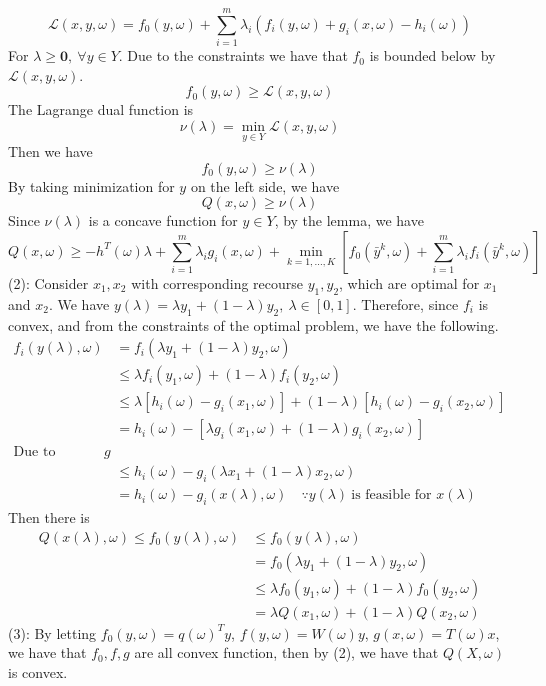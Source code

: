 \documentclass[11pt,a4paper]{article}
\begin{document}
$$\mathcal{L}(x,y,\omega)=f_{0}(y,\omega)+\sum_{i=1}^{m}\lambda_{i}(f_{i}(y,\omega)+g_{i}(x,\omega)-h_{i}(\omega))$$
For $\lambda\geq \textbf{0},\ \forall y\in Y $.
Due to the constraints we have that $f_{0}$ is bounded below by $\mathcal{L}(x,y,\omega)$.
$$f_{0}(y,\omega)\geq\mathcal{L}(x,y,\omega)$$ The Lagrange dual function is 
$$\nu(\lambda)=\min_{y\in Y}\mathcal{L}(x,y,\omega)$$
Then we have $$f_{0}(y,\omega)\geq\nu(\lambda)$$
By taking minimization for $y$ on the left side, we have $$Q(x,\omega)\geq\nu(\lambda)$$
Since $\nu(\lambda)$ is a concave function for $y\in Y$, by the lemma, we have 
$$Q(x,\omega)\geq -h^{T}(\omega)\lambda + \sum_{i=1}^{m}\lambda_{i}g_{i}(x,\omega)+\min_{k=1,\ldots,K}\left[f_{0}(\bar{y}^{k},\omega)+\sum_{i=1}^{m}\lambda_{i}f_{i}(\bar{y}^{k},\omega)\right]$$
(2): Consider $x_{1},x_{2}$ with corresponding recourse $y_{1},y_{2}$, which are optimal for $x_{1}$ and $x_{2}$.
We have $y(\lambda)=\lambda y_{1}+(1-\lambda)y_{2}, \ \lambda\in[0,1]$.
Therefore, since $f_{i}$ is convex, and from the constraints of the optimal problem, we have the following. $$\begin{aligned}
f_{i}(y(\lambda),\omega)&=f_{i}(\lambda y_{1}+(1-\lambda)y_{2},\omega)\\
&\leq \lambda f_{i}(y_{1},\omega)+(1-\lambda)f_{i}(y_{2},\omega)\\
&\leq \lambda\left[h_{i}(\omega)-g_{i}(x_{1},\omega)\right]+(1-\lambda)\left[h_{i}(\omega)-g_{i}(x_{2},\omega)\right]\\
&= h_{i}(\omega)-\left[\lambda g_{i}(x_{1},\omega)+(1-\lambda)g_{i}(x_{2},\omega)\right]\\
\text{Due to convexity of $g$}\\
& \leq h_{i}(\omega)-g_{i}(\lambda x_{1}+(1-\lambda)x_{2},\omega)\\
& = h_{i}(\omega)-g_{i}(x(\lambda),\omega) \quad \because y(\lambda) \ \text{is feasible for $x(\lambda)$}
\end{aligned}$$
Then there is $$\begin{aligned}
Q(x(\lambda),\omega)\leq f_{0}(y(\lambda),\omega)&\leq f_{0}(y(\lambda),\omega)\\
&= f_{0}(\lambda y_{1}+(1-\lambda)y_{2},\omega)\\
&\leq \lambda f_{0}(y_{1},\omega)+(1-\lambda)f_{0}(y_{2},\omega)\\
&= \lambda Q(x_{1},\omega)+(1-\lambda)Q(x_{2},\omega)
\end{aligned}$$
(3):
By letting $f_{0}(y,\omega)=q(\omega)^{T}y$, $f(y,\omega)=W(\omega)y$, $g(x,\omega)=T(\omega)x$, we have that $f_{0},f,g$ are all convex function, then by (2), we have that $Q(X,\omega)$ is convex. 
\end{document}
